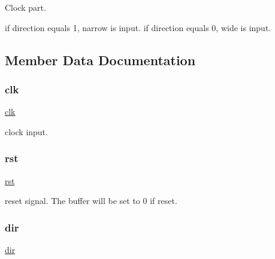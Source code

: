 Clock part. 

if direction equals 1, narrow is input. if direction equals 0, wide is input. 

\subsection{Member Data Documentation}
\mbox{\label{enumfifo_ae0fe05859d03589d61cf0f69de9e7678}} 
\subsubsection{\texorpdfstring{clk}{clk}}
{\footnotesize\ttfamily \mbox{\hyperlink{enumfifo_ae0fe05859d03589d61cf0f69de9e7678}{clk}} \hspace{0.3cm}{\ttfamily [Input]}}



clock input. 

\mbox{\label{enumfifo_a1cb4b0e761fcf0e2e1ff541d6af4ebad}} 
\subsubsection{\texorpdfstring{rst}{rst}}
{\footnotesize\ttfamily \mbox{\hyperlink{enumfifo_a1cb4b0e761fcf0e2e1ff541d6af4ebad}{rst}} \hspace{0.3cm}{\ttfamily [Input]}}



reset signal. The buffer will be set to 0 if reset. 

\mbox{\label{enumfifo_aaf4a37103205f6662b0a1d80a738adaa}} 
\subsubsection{\texorpdfstring{dir}{dir}}
{\footnotesize\ttfamily \mbox{\hyperlink{enumfifo_aaf4a37103205f6662b0a1d80a738adaa}{dir}} \hspace{0.3cm}{\ttfamily [Input]}}

\mbox{\label{enumfifo_a0a60ca7138c275b0b4c6a99507b7f32b}} 
